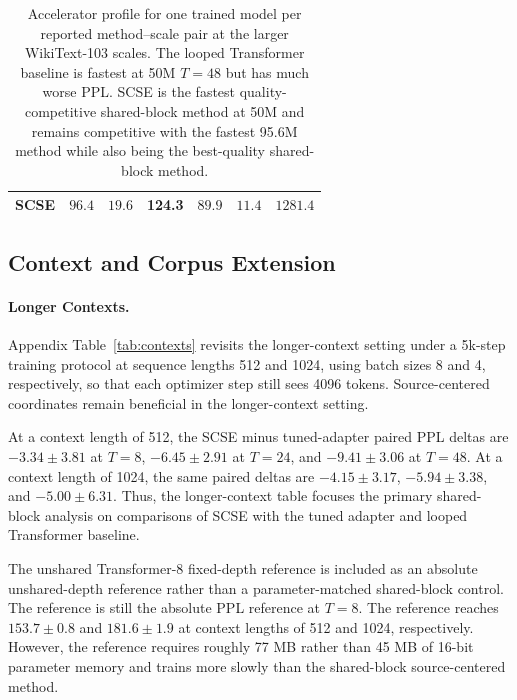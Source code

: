 \documentclass[letterpaper]{article} %
\newcommand{\SCSE}{\textsc{SCSE}}
\theoremstyle{remark}
\begin{document}
\begin{table}[t!]
{\begin{tabular}{lrrrrrr}
			\SCSE{}                            & $\mathbf{96.4}$           & $19.6$                             & \textbf{124.3} & $89.9$        & $11.4$                                & $1281.4$         \\
			\bottomrule
		\end{tabular}
	}%
	\caption{Accelerator profile for one trained model per reported method--scale pair at the larger WikiText-103 scales.  The looped Transformer baseline is fastest at 50M $T=48$ but has much worse PPL.  \SCSE{} is the fastest quality-competitive shared-block method at 50M and remains competitive with the fastest 95.6M method while also being the best-quality shared-block method.}
	\label{tab:scale_profile}
\end{table}

\subsection{Context and Corpus Extension}
\label{app:context-corpus-extension}
\paragraph{Longer Contexts.} Appendix Table~\ref{tab:contexts} revisits the longer-context setting under a 5k-step training protocol at sequence lengths 512 and 1024, using batch sizes 8 and 4, respectively, so that each optimizer step still sees 4096 tokens.  Source-centered coordinates remain beneficial in the longer-context setting.

At a context length of 512, the \SCSE{} minus tuned-adapter paired PPL deltas are $-3.34\pm3.81$ at $T=8$, $-6.45\pm2.91$ at $T=24$, and $-9.41\pm3.06$ at $T=48$.  At a context length of 1024, the same paired deltas are $-4.15\pm3.17$, $-5.94\pm3.38$, and $-5.00\pm6.31$.  Thus, the longer-context table focuses the primary shared-block analysis on comparisons of \SCSE{} with the tuned adapter and looped Transformer baseline.

The unshared Transformer-8 fixed-depth reference is included as an absolute unshared-depth reference rather than a parameter-matched shared-block control.  The reference is still the absolute PPL reference at $T=8$.  The reference reaches $153.7\pm0.8$ and $181.6\pm1.9$ at context lengths of 512 and 1024, respectively.  However, the reference requires roughly 77 MB rather than 45 MB of 16-bit parameter memory and trains more slowly than the shared-block source-centered method.
\end{document}
